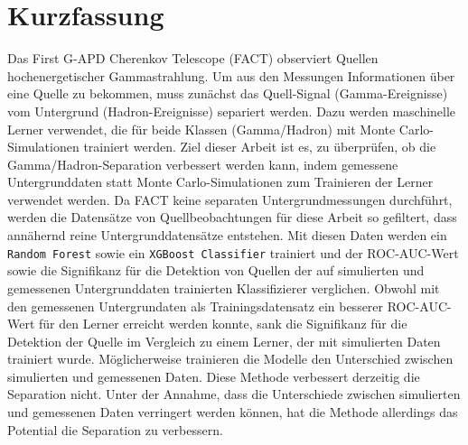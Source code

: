 \thispagestyle{plain}

\section*{Kurzfassung}
Das First G-APD Cherenkov Telescope (FACT) observiert Quellen hochenergetischer Gammastrahlung.
Um aus den Messungen Informationen über eine Quelle zu bekommen, muss zunächst das Quell-Signal (Gamma-Ereignisse) vom Untergrund (Hadron-Ereignisse) separiert werden.
Dazu werden maschinelle Lerner verwendet, die für beide Klassen (Gamma/Hadron) mit Monte Carlo-Simulationen trainiert werden.
Ziel dieser Arbeit ist es, zu überprüfen, ob die Gamma/Hadron-Separation verbessert werden kann, indem gemessene Untergrunddaten statt Monte Carlo-Simulationen zum Trainieren der Lerner verwendet werden.
Da FACT keine separaten Untergrundmessungen durchführt, werden die Datensätze von Quellbeobachtungen für diese Arbeit so gefiltert, dass annähernd reine Untergrunddatensätze entstehen.
Mit diesen Daten werden ein \texttt{Random Forest} sowie ein \texttt{XGBoost Classifier} trainiert und der ROC-AUC-Wert sowie die Signifikanz für die Detektion von Quellen der auf simulierten und gemessenen Untergrunddaten trainierten Klassifizierer verglichen. 
Obwohl mit den gemessenen Untergrundaten als Trainingsdatensatz ein besserer ROC-AUC-Wert für den Lerner erreicht werden konnte, sank die Signifikanz für die Detektion der Quelle im Vergleich zu einem Lerner, der mit simulierten Daten trainiert wurde. 
Möglicherweise trainieren die Modelle den Unterschied zwischen simulierten und gemessenen Daten. 
Diese Methode verbessert derzeitig die Separation nicht. 
Unter der Annahme, dass die Unterschiede zwischen simulierten und gemessenen Daten verringert werden können, hat die Methode allerdings das Potential die Separation zu verbessern. 
